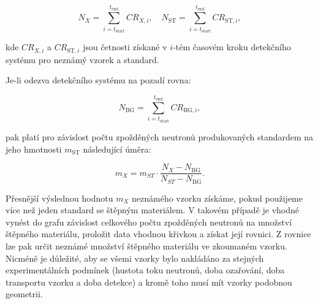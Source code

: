 \[
N_X = \sum_{i = t_\text{start}}^{t_\text{end}} CR_{X,i}, \quad N_\text{ST} = \sum_{i = t_\text{start}}^{t_\text{end}} CR_{\text{ST},i},
\]

kde $CR_{X,i}$ a $CR_{\text{ST},i}$ jsou četnosti získané v $i$-tém časovém kroku detekčního systému pro neznámý vzorek a standard.

Je-li odezva detekčního systému na pozadí rovna:

\[
N_\text{BG} = \sum_{i = t_\text{start}}^{t_\text{end}} CR_{\text{BG},i},
\]

pak platí pro závislost počtu zpožděných neutronů produkovaných standardem na jeho hmotnosti $m_\text{ST}$ následující úměra:

\begin{equation}
m_X = m_{ST} \cdot \frac{N_X - N_\text{BG}}{N_{ST}-N_\text{BG}}.
\end{equation}

Přesnější výslednou hodnotu $m_X$ neznámého vzorku získáme, pokud použijeme více než jeden standard se štěpným materiálem. V takovém případě je vhodné vynést do grafu závislost celkového počtu zpožděných neutronů na množství štěpného materiálu, proložit data vhodnou křivkou a získat její rovnici. Z rovnice lze pak určit neznámé množství štěpného materiálu ve zkoumaném vzorku. Nicméně je důležité, aby se všemi vzorky bylo nakládáno za stejných experimentálních podmínek (hustota toku neutronů, doba ozařování, doba transportu vzorku a doba detekce) a kromě toho musí mít vzorky podobnou geometrii.